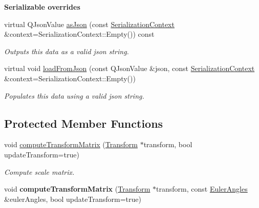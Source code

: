 \begin{Indent}\textbf{ Serializable overrides}\par
\begin{DoxyCompactItemize}
\item 
\mbox{\label{classrev_1_1_rotation_component_ab6e64a4db054aa2c85fc10393f68e38a}} 
virtual Q\+Json\+Value \mbox{\hyperlink{classrev_1_1_rotation_component_ab6e64a4db054aa2c85fc10393f68e38a}{as\+Json}} (const \mbox{\hyperlink{structrev_1_1_serialization_context}{Serialization\+Context}} \&context=Serialization\+Context\+::\+Empty()) const
\begin{DoxyCompactList}\small\item\em Outputs this data as a valid json string. \end{DoxyCompactList}\item 
\mbox{\label{classrev_1_1_rotation_component_aa607f698b0efe4033957a6863cd3177e}} 
virtual void \mbox{\hyperlink{classrev_1_1_rotation_component_aa607f698b0efe4033957a6863cd3177e}{load\+From\+Json}} (const Q\+Json\+Value \&json, const \mbox{\hyperlink{structrev_1_1_serialization_context}{Serialization\+Context}} \&context=Serialization\+Context\+::\+Empty())
\begin{DoxyCompactList}\small\item\em Populates this data using a valid json string. \end{DoxyCompactList}\end{DoxyCompactItemize}
\end{Indent}
\subsection*{Protected Member Functions}
\begin{DoxyCompactItemize}
\item 
\mbox{\label{classrev_1_1_rotation_component_a0e0b5aa37def5cab5e39175a1db16627}} 
void \mbox{\hyperlink{classrev_1_1_rotation_component_a0e0b5aa37def5cab5e39175a1db16627}{compute\+Transform\+Matrix}} (\mbox{\hyperlink{classrev_1_1_transform}{Transform}} $\ast$transform, bool update\+Transform=true)
\begin{DoxyCompactList}\small\item\em Compute scale matrix. \end{DoxyCompactList}\item 
\mbox{\label{classrev_1_1_rotation_component_afa850e3dbd804a54898bee5aae6845b6}} 
void {\bfseries compute\+Transform\+Matrix} (\mbox{\hyperlink{classrev_1_1_transform}{Transform}} $\ast$transform, const \mbox{\hyperlink{classrev_1_1_euler_angles}{Euler\+Angles}} \&euler\+Angles, bool update\+Transform=true)
\end{DoxyCompactItemize}
